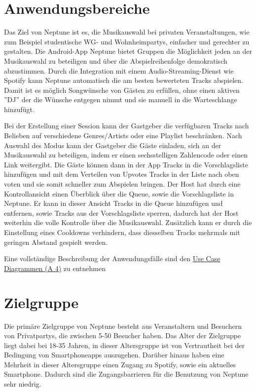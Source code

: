 \documentclass[oneside, ngerman]{sdqtechreport}
\begin{document}
\section{Anwendungsbereiche}
\label{sec:Einleitung:Anwendungsbereich}

Das Ziel von Neptune ist es, die Musikauswahl bei privaten Veranstaltungen, wie zum Beispiel studentische WG- und Wohnheimpartys, einfacher und gerechter zu gestalten.
Die Android-App Neptune bietet Gruppen die Möglichkeit jeden an der Musikauswahl zu beteiligen und über die Abspielreihenfolge demokratisch abzustimmen. Durch die Integration mit einem Audio-Streaming-Dienst wie Spotify kann Neptune automatisch die am besten bewerteten Tracks abspielen. Damit ist es möglich Songwünsche von Gästen zu erfüllen, ohne einen aktiven ''DJ''  der die Wünsche entgegen nimmt und sie manuell in die Warteschlange hinzufügt.

Bei der Erstellung einer Session kann der Gastgeber die verfügbaren Tracks nach Belieben auf verschiedene Genres/Artists oder eine Playlist beschränken. Nach Auswahl des Modus kann der Gastgeber die Gäste einladen, sich an der Musikauswahl zu beteiligen, indem er einen sechsstelligen Zahlencode oder einen Link weitergibt. Die Gäste können dann in der App Tracks in die Vorschlagsliste hinzufügen und mit dem Verteilen von Upvotes Tracks in der Liste nach oben voten und sie somit schneller zum Abspielen bringen. Der Host hat durch eine Kontrollansicht einen Überblick über die Queue, sowie die Vorschlagsliste in Neptune. Er kann in dieser Ansicht Tracks in die Queue hinzufügen und entfernen, sowie Tracks aus der Vorschlagsliste sperren, dadurch hat der Host weiterhin die volle Kontrolle über die Musikauswahl. Zusätzlich kann er durch die Einstellung
eines Cooldowns verhindern, dass diesselben Tracks mehrmals mit geringen Abstand gespielt werden.

Eine vollständige Beschreibung der Anwendungsfälle sind  den \hyperlink{Anwendungsfaelle}{Use Case Diagrammen (A 4)} zu entnehmen   


\section{Zielgruppe}
\label{sec:Einleitung:Zielgruppe}

Die primäre Zielgruppe von Neptune besteht aus Veranstaltern und Besuchern von Privatpartys, die zwischen 5-50 Besucher haben. Das Alter der Zielgruppe liegt dabei bei 18-35 Jahren, in dieser Altersgruppe ist von Vertrautheit bei der Bedingung von Smartphoneapps auszugehen. Darüber hinaus haben eine Mehrheit in dieser Altersgruppe einen Zugang zu Spotify, sowie ein aktuelles Smartphone. Dadurch sind die Zugangsbarrieren für die Benutzung von Neptune sehr niedrig.
\end{document}
